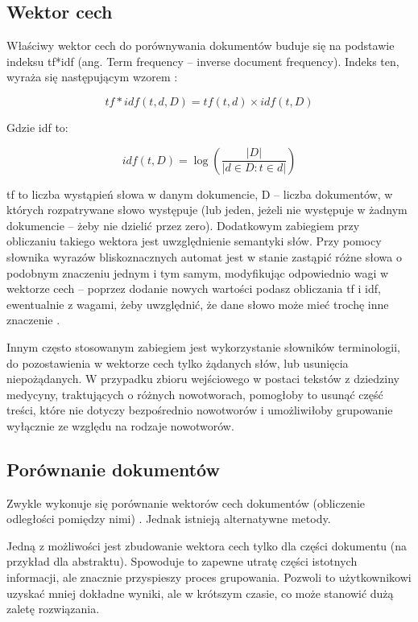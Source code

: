 \documentclass{article}
\begin{document}
\subsection{Wektor cech}

Właściwy wektor cech do porównywania dokumentów buduje się na podstawie indeksu tf*idf (ang. Term frequency – inverse document frequency). Indeks ten, wyraża się następującym wzorem :

\[ tf*idf(t, d, D) = tf(t, d)\times idf(t, D) \]

Gdzie idf to: 

\[ idf(t, D) = \log(\frac{|D|}{|d \in D: t \in d|})  \]

tf to liczba wystąpień słowa w danym dokumencie, D – liczba dokumentów, w których rozpatrywane słowo występuje (lub jeden, jeżeli nie występuje w żadnym dokumencie – żeby nie dzielić przez zero).  Dodatkowym zabiegiem przy obliczaniu takiego wektora jest uwzględnienie semantyki słów. Przy pomocy słownika wyrazów bliskoznacznych automat jest w stanie zastąpić różne słowa o podobnym znaczeniu jednym i tym samym, modyfikując odpowiednio wagi w wektorze cech – poprzez dodanie nowych wartości podasz obliczania tf i idf, ewentualnie z wagami, żeby uwzględnić, że dane słowo może mieć trochę inne znaczenie .

Innym  często stosowanym zabiegiem jest wykorzystanie słowników terminologii, do pozostawienia w wektorze cech tylko żądanych słów, lub usunięcia niepożądanych. W przypadku zbioru wejściowego w postaci tekstów z dziedziny medycyny, traktujących o różnych nowotworach, pomogłoby to usunąć część treści, które nie dotyczy bezpośrednio nowotworów i umożliwiłoby grupowanie wyłącznie ze względu na rodzaje nowotworów.

\subsection{Porównanie dokumentów}

Zwykle wykonuje się porównanie wektorów cech dokumentów (obliczenie odległości pomiędzy nimi) \todo{[4]}. Jednak istnieją alternatywne metody. 

Jedną z możliwości jest zbudowanie wektora cech tylko dla części dokumentu (na przykład dla abstraktu). Spowoduje to zapewne utratę części istotnych informacji, ale znacznie przyspieszy proces grupowania. Pozwoli to użytkownikowi uzyskać mniej dokładne wyniki, ale w krótszym czasie, co może stanowić dużą zaletę rozwiązania. 
\end{document}

